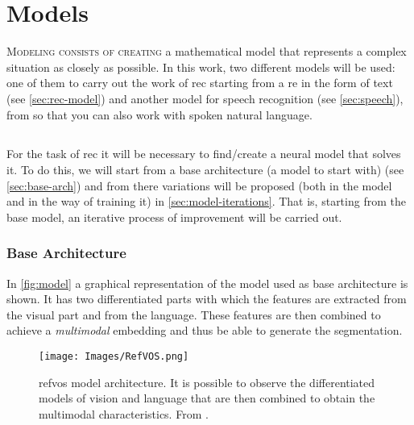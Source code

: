 

\chapter{Models}\label{cha:models}



\lettrine{M}{odeling consists of creating} a mathematical model that represents
a complex situation as closely as possible. In this work, two different models
will be used: one of them to carry out the work of \gls{rec} starting from a
\gls{re} in the form of text (see \vref{sec:rec-model}) and another model for
speech recognition (see \vref{sec:speech}), from so that you can also work with
spoken natural language.



\section{}\label{sec:rec-model}

For the task of \gls{rec} it will be necessary to find/create a neural model
that solves it. To do this, we will start from a base architecture (a model to
start with) (see \vref{sec:base-arch}) and from there variations will be
proposed (both in the model and in the way of training it) in
\vref{sec:model-iterations}. That is, starting from the base model, an
iterative process of improvement will be carried out.


\subsection{Base Architecture}\label{sec:base-arch}

In \vref{fig:model} a graphical representation of the model used as base
architecture is shown. It has two differentiated parts with which the features
are extracted from the visual part and from the language. These features are
then combined to achieve a \emph{multimodal} embedding and thus be able to
generate the segmentation.

\begin{figure}[ht]
  \centering
  \texttt{[image: Images/RefVOS.png]}
  \caption[ model architecture]{\gls{refvos} model
    architecture. It is possible to observe the differentiated models of vision
    and language that are then combined to obtain the multimodal
    characteristics. From .}%
  \label{fig:model}
\end{figure}


